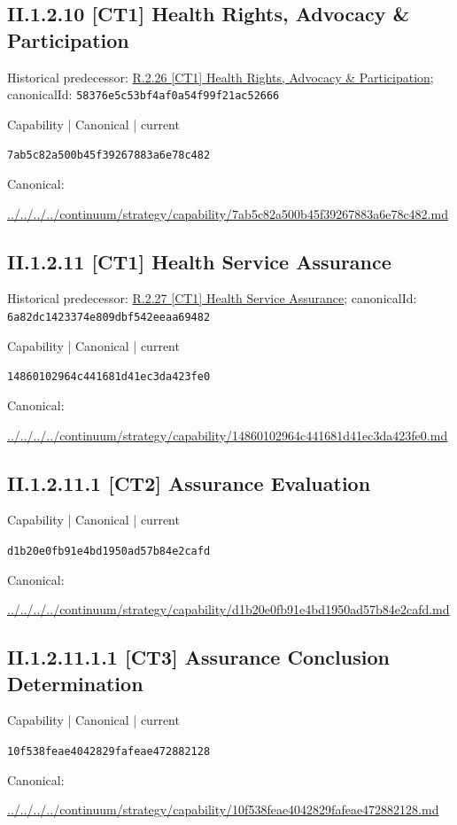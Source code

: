 \documentclass[10pt,a4paper]{article}
\begin{document}
\subsection*{II.1.2.10 [CT1] Health Rights, Advocacy \& Participation}
Historical predecessor: \hyperref[element-58376e5c53bf4af0a54f99f21ac52666]{R.2.26 [CT1] Health Rights, Advocacy \& Participation}; canonicalId: \texttt{58376e5c53bf4af0a54f99f21ac52666}\par
\label{element-7ab5c82a500b45f39267883a6e78c482}
{\small Capability | Canonical | current}\par
\texttt{7ab5c82a500b45f39267883a6e78c482}\par
Canonical: \par
{\footnotesize\url{../../../../continuum/strategy/capability/7ab5c82a500b45f39267883a6e78c482.md}}\par
\subsection*{II.1.2.11 [CT1] Health Service Assurance}
Historical predecessor: \hyperref[element-6a82dc1423374e809dbf542eeaa69482]{R.2.27 [CT1] Health Service Assurance}; canonicalId: \texttt{6a82dc1423374e809dbf542eeaa69482}\par
\label{element-14860102964c441681d41ec3da423fe0}
{\small Capability | Canonical | current}\par
\texttt{14860102964c441681d41ec3da423fe0}\par
Canonical: \par
{\footnotesize\url{../../../../continuum/strategy/capability/14860102964c441681d41ec3da423fe0.md}}\par
\subsection*{II.1.2.11.1 [CT2] Assurance Evaluation}
\label{element-d1b20e0fb91e4bd1950ad57b84e2cafd}
{\small Capability | Canonical | current}\par
\texttt{d1b20e0fb91e4bd1950ad57b84e2cafd}\par
Canonical: \par
{\footnotesize\url{../../../../continuum/strategy/capability/d1b20e0fb91e4bd1950ad57b84e2cafd.md}}\par
\subsection*{II.1.2.11.1.1 [CT3] Assurance Conclusion Determination}
\label{element-10f538feae4042829fafeae472882128}
{\small Capability | Canonical | current}\par
\texttt{10f538feae4042829fafeae472882128}\par
Canonical: \par
{\footnotesize\url{../../../../continuum/strategy/capability/10f538feae4042829fafeae472882128.md}}\par
\end{document}
